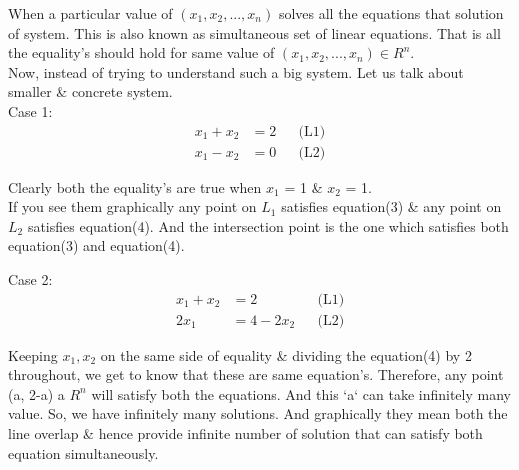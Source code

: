 \documentclass{article}
\begin{document}
When a particular value of \((x_1, x_2, ..., x_n)\) solves all the equations that solution of system. This is also known as simultaneous set of linear equations. That is all the equality's
should hold for same value of \((x_1, x_2, ..., x_n) \in R^n\).\\

Now, instead of trying to understand such a big system. Let us talk about smaller \& concrete system.\\
Case 1:\\
\begin{align}
    x_1 + x_2 &= 2 &&  \text{(L1)}\\
    x_1 - x_2 &= 0 &&  \text{(L2)}
\end{align}

Clearly both the equality's are true when \(x_1\) = 1 \& \(x_2\) = 1.\\

If you see them graphically any point on \(L_1\) satisfies equation(3) \& any point on \(L_2\) satisfies equation(4). And the intersection point is the one which satisfies both equation(3) and equation(4).\\


Case 2:\\

\begin{align}
    x_1 + x_2 &= 2 &&  \text{(L1)}\\
    2x_1 &= 4 - 2x_2 &&  \text{(L2)}
\end{align}

Keeping $x_1, x_2$ on the same side of equality \& dividing the equation(4) by 2 throughout, we get to know that these are same equation's. Therefore, any point (a, 2-a) \forall a \in \(R^n\) will satisfy both the equations. And this `a` can take infinitely many value. So, we have infinitely many solutions. And graphically they mean both the line overlap \& hence provide infinite number of solution that can satisfy both equation simultaneously.\\
\end{document}
